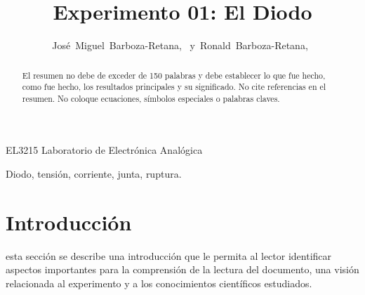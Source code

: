 \documentclass[journal]{IEEEtran}
\begin{document}
%
\title{Experimento 01: El Diodo}


\author{José~Miguel~Barboza-Retana,~
        y~Ronald~Barboza-Retana,~
}


%
{EL3215 Laboratorio de Electrónica Analógica}


\maketitle


\begin{abstract}
El resumen no debe de exceder de 150 palabras y debe establecer lo que fue hecho, como fue hecho, los resultados principales y su significado. No cite referencias en el resumen. No coloque ecuaciones, símbolos especiales o palabras claves.
\end{abstract}

\begin{IEEEkeywords}
Diodo, tensión, corriente, junta, ruptura.
\end{IEEEkeywords}


\section{Introducción}

 esta sección se describe una introducción que le permita al lector identificar aspectos importantes para la comprensión de la lectura del documento, una visión relacionada al experimento y a los conocimientos científicos estudiados.


\end{document}
